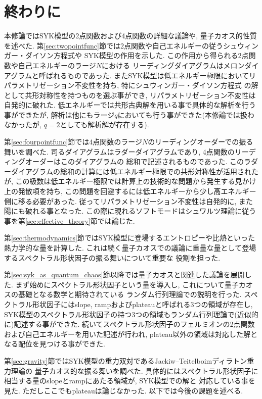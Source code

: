 \section{終わりに\label{sec:conclusion}}
本修論ではSYK模型の2点関数および4点関数の詳細な議論や, 量子カオス的性質を述べた. 
第\ref{sec:twopointfunc}節では2点関数や自己エネルギーの従うシュウィンガー・ダイソン方程式や
SYK模型の作用を示した. 
この作用から得られる2点関数や自己エネルギーのラージ$N$における
リーディングダイアグラムはメロンダイアグラムと呼ばれるものであった. 
またSYK模型は低エネルギー極限においてリパラメトリゼーション不変性を持ち, 特にシュウィンガー・ダイソン方程式
の解として共形対称性を持つものを選ぶ事ができ, リパラメトリゼーション不変性は自発的に破れた. 
低エネルギーでは共形古典解を用いる事で具体的な解析を行う事ができたが, 
解析は他にもラージ$q$においても行う事ができた(本修論では扱わなかったが, $q=2$としても解析解が存在する). 

第\ref{sec:fourpointfunc}節では4点関数のラージ$N$のリーディングオーダーでの振る舞いを調べた. 
司るダイアグラムはラダーダイアグラムであり, 4点関数のリーディングオーダーはこのダイアグラムの
総和で記述されるものであった. 
このラダーダイアグラムの総和の計算には低エネルギー極限での共形対称性が活用されたが, 
この級数は低エネルギー極限では計算上の技術的な問題から発生する見かけ上の発散項を持ち, 
この問題を回避するには低エネルギーから少し高エネルギー側に移る必要があった. 
従ってリパラメトリゼーション不変性は自発的に, また陽にも破れる事となった. 
この際に現れるソフトモードはシュワルツ理論に従う事を第\ref{sec:effective_theory}節では論じた. 

第\ref{sec:thermodynamics}節ではSYK模型に登場するエントロピーや比熱といった熱力学的な量を計算した. 
これは続く量子カオスでの議論に重量な量として登場するスペクトラル形状因子の振る舞いについて重要な
役割を担った. 

第\ref{sec:syk_as_quantum_chaos}節以降では量子カオスと関連した議論を展開した. 
まず始めにスペクトラル形状因子という量を導入し, これについて量子カオスの基礎となる数学と期待されている
ランダム行列理論での説明を行った. 
スペクトラル形状因子にはslope, rampおよびplateauと呼ばれる3つの領域が存在し, 
SYK模型のスペクトラル形状因子の持つ3つの領域もランダム行列理論で(近似的に)記述する事ができた. 
続いてスペクトラル形状因子のフェルミオンの2点関数および自己エネルギーを用いた記述が行われ, 
plateau以外の領域は対応した解となる配位を見つける事ができた. 

第\ref{sec:gravity}節ではSYK模型の重力双対であるJackiw--Teitelboimディラトン重力理論の
量子カオス的な振る舞いを調べた. 
具体的にはスペクトラル形状因子に相当する量のslopeとrampにあたる領域が, SYK模型での解と
対応している事を見た. 
ただしここでもplateauは論じなかった. 
以下では今後の課題を述べる. 

